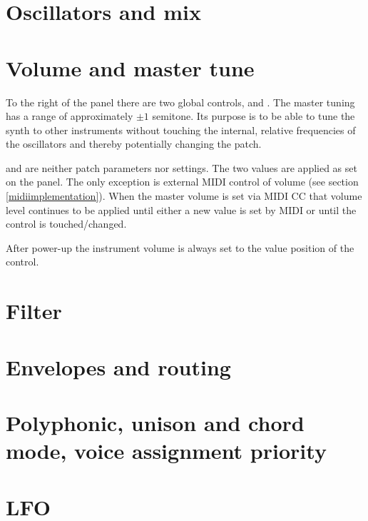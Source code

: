 \documentclass[landscape, 11pt, oneside]{report}
\newenvironment{flowtext}{\addmargin[0cm]{7cm}}{\endaddmargin} %
\begin{document}
\begin{flowtext}


\section{Oscillators and mix}\label{osc}



\section{Volume and master tune}

To the right of the panel there are two global controls, \mastertune and \mastervol. The master tuning has a range of approximately $\pm 1$ semitone. Its purpose is to be able to tune the synth to other instruments without touching the internal, relative frequencies of the oscillators and thereby potentially changing the patch.

\mastervol and \mastertune are neither patch parameters nor settings. The two values are applied as set on the panel. The only exception is external MIDI control of volume (see section \ref{midiimplementation}). When the master volume is set via MIDI CC that volume level continues to be applied until either a new value is set by MIDI or until the \mastervol control is touched/changed. 

After power-up the instrument volume is always set to the value position of the \mastervol control.

\section{Filter}\label{filter}



\section{Envelopes and routing}\label{envelopes}



\section{Polyphonic, unison and chord mode, voice assignment priority}\label{poly-unison-voice}



\section{LFO}\label{lfo}


\end{flowtext}
\end{document}
